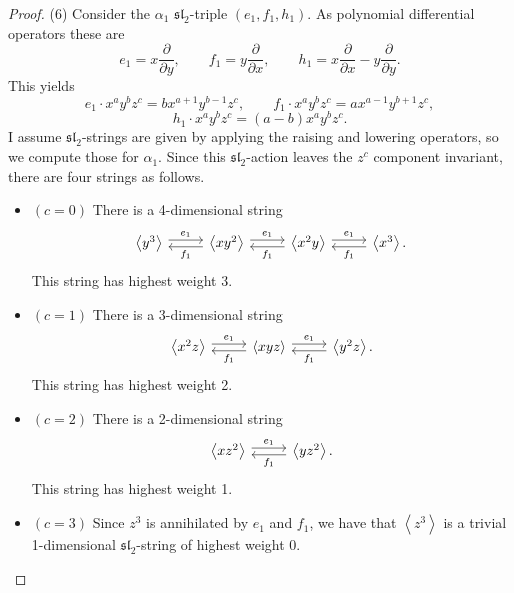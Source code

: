 \documentclass[11pt, letterpaper]{article}
\theoremstyle{plain}
\begin{document}
\begin{proof}
	(6) Consider the $\alpha _1$ $\mathfrak{sl} _2$-triple $(e_1,f_1,h_1)$. As polynomial differential operators these are
	\[
		e_1 = x \frac{\partial }{\partial y} ,\qquad f_1 = y \frac{\partial }{\partial x} ,\qquad h_1 = x \frac{\partial }{\partial x} - y \frac{\partial }{\partial y} 
	.\]
	This yields
	\[
		e_1\cdot x^ay^bz^c = bx^{a+1} y^{b-1} z^c,\qquad f_1\cdot x^ay^bz^c = a x^{a-1} y^{b+1} z^c,
	\]
	\[
		h_1\cdot x^ay^bz^c = (a-b)x^ay^bz^c
	.\]
	I assume $\mathfrak{sl} _2$-strings are given by applying the raising and lowering operators, so we compute those for $\alpha _1$. Since this $\mathfrak{sl} _2$-action leaves the $z^c$ component invariant, there are four strings as follows.
	\begin{itemize}
		\item $(c=0)$ There is a 4-dimensional string
			\[\begin{tikzcd}[row sep = 2.5em, column sep = 2.5em]
			\left\langle y^3 \right\rangle \ar[" e_1 ", shift left, r]  & \left\langle xy^2 \right\rangle \ar[" e_1 ", shift left, r] \ar[" f_1 ", shift left, l]  & \left\langle x^2y \right\rangle \ar[" e_1 ", shift left, r] \ar[" f_1 ", shift left, l]  & \left\langle x^3 \right\rangle \ar[" f_1 ", shift left, l] .
			\end{tikzcd}\]
			This string has highest weight 3.
		\item $(c=1)$ There is a 3-dimensional string
			\[\begin{tikzcd}[row sep = 2.5em, column sep = 2.5em]
			\left\langle x^2z \right\rangle \ar[" e_1 ", shift left, r]  & \left\langle xyz \right\rangle \ar[" e_1 ", shift left, r] \ar[" f_1 ", shift left, l]  & \left\langle y^2z \right\rangle \ar[" f_1 ", shift left, l] .
			\end{tikzcd}\]
			This string has highest weight 2.
		\item $(c=2)$ There is a 2-dimensional string
			\[\begin{tikzcd}[row sep = 2.5em, column sep = 2.5em]
			\left\langle xz^2 \right\rangle \ar[" e_1 ", shift left, r]  & \left\langle yz^2 \right\rangle \ar[" f_1 ", shift left, l] .
			\end{tikzcd}\]
			This string has highest weight 1.
		\item $(c=3)$ Since $z^3$ is annihilated by $e_1$ and $f_1$, we have that $\left\langle z^3 \right\rangle $ is a trivial 1-dimensional $\mathfrak{sl} _2$-string of highest weight 0.
	\end{itemize}
	

\end{proof}
\end{document}
